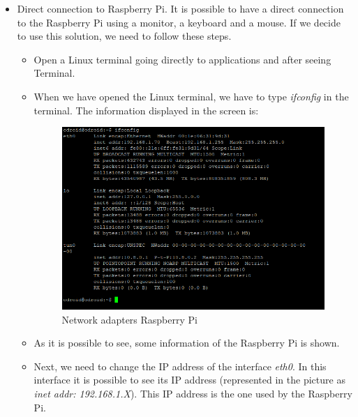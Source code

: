 \begin{itemize}

\item Direct connection to Raspberry Pi. It is possible to have a direct connection to the Raspberry Pi using a monitor, a keyboard and a mouse. If we decide to use this solution, we need to follow these steps.

\begin{itemize}

\item Open a Linux terminal going directly to applications and after seeing Terminal.

\item When we have opened the Linux terminal, we have to type \textit{ifconfig} in the terminal. The information displayed in the screen is:

\begin{figure}[H]
\begin{centering}
\includegraphics[scale=0.8]{IMGS/ifconfig_raspberry_pi.PNG}
\caption{Network adapters Raspberry Pi \label{Network adapters Raspberry Pi}}
\end{centering}
\end{figure} 

\item As it is possible to see, some information of the Raspberry Pi is shown.

\item Next, we need to change the IP address of the interface \textit{eth0}. In this interface it is possible to see its IP address (represented in the picture as \textit{inet addr: 192.168.1.X}). This IP address is the one used by the Raspberry Pi.


\end{itemize}
\end{itemize}
